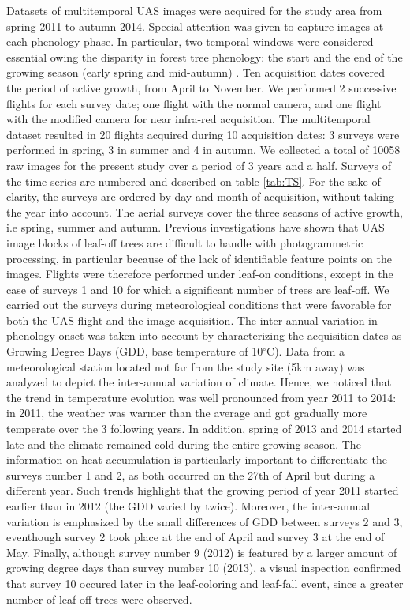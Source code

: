 \documentclass[remotesensing,article,submit,moreauthors,pdftex,12pt,a4paper]{mdpi} %
\begin{document}
Datasets of multitemporal UAS images were acquired for the study area from spring 2011 to autumn 2014. 
Special attention was given to capture images at each phenology phase. 
In particular, two temporal windows were considered essential owing the disparity in forest tree phenology: the start and the end of the growing season (early spring and mid-autumn) \cite{hill_mapping_2010, key_comparison_2001}. 
Ten acquisition dates covered the period of active growth, from April to November. 
We performed 2 successive flights for each survey date; one flight with the normal camera, and one flight with the modified camera for near infra-red acquisition. 
The multitemporal dataset resulted in 20 flights acquired during 10 acquisition dates: 3 surveys were performed in spring, 3 in summer and 4 in autumn. 
We collected a total of 10058 raw images for the present study over a period of 3 years and a half. 
Surveys of the time series are numbered and described on table \ref{tab:TS}.
For the sake of clarity, the surveys are ordered by day and month of acquisition, without taking the year into account. 
The aerial surveys cover the three seasons of active growth, i.e spring, summer and autumn. Previous investigations have shown that UAS image blocks of leaf-off trees are difficult to handle with photogrammetric processing, in particular because of the lack of identifiable feature points on the images. 
Flights were therefore performed under leaf-on conditions, except in the case of surveys 1 and 10 for which a significant number of trees are leaf-off.
We carried out the surveys during meteorological conditions that were favorable for both the UAS flight and the image acquisition.
The inter-annual variation in phenology onset was taken into account by characterizing the acquisition dates as Growing Degree Days (GDD, base temperature of 10$^{\circ}$C). 
Data from a meteorological station located not far from the study site (5km away) was analyzed to depict the inter-annual variation of climate. 
Hence, we noticed that the trend in temperature evolution was well pronounced from year 2011 to 2014: in 2011, the weather was warmer than the average and got gradually more temperate over the 3 following years. In addition, spring of 2013 and 2014 started late and the climate remained cold during the entire growing season. 
The information on heat accumulation is particularly important to differentiate the surveys number 1 and 2, as both occurred on the 27th of April but during a different year. 
Such trends highlight that the growing period of year 2011 started earlier than in 2012 (the GDD varied by twice). 
Moreover, the inter-annual variation is emphasized by the small differences of GDD between surveys 2 and 3, eventhough survey 2 took place at the end of April and survey 3 at the end of May. 
Finally, although survey number 9 (2012) is featured by a larger amount of growing degree days than survey number 10 (2013), a visual inspection confirmed that survey 10 occured later in the leaf-coloring and leaf-fall event, since a greater number of leaf-off trees were observed.
\end{document}

